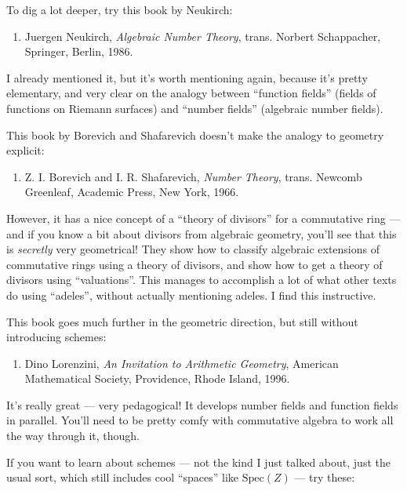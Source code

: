 \documentclass{article}
\def\tightlist{}
\begin{document}
To dig a lot deeper, try this book by Neukirch:

\begin{enumerate}
\def\labelenumi{\arabic{enumi})}
\setcounter{enumi}{2}
\tightlist
\item
  Juergen Neukirch, \emph{Algebraic Number Theory}, trans. Norbert
  Schappacher, Springer, Berlin, 1986.
\end{enumerate}

I already mentioned it, but it's worth mentioning again, because it's
pretty elementary, and very clear on the analogy between ``function
fields'' (fields of functions on Riemann surfaces) and ``number fields''
(algebraic number fields).

This book by Borevich and Shafarevich doesn't make the analogy to
geometry explicit:

\begin{enumerate}
\def\labelenumi{\arabic{enumi})}
\setcounter{enumi}{3}
\tightlist
\item
  Z. I. Borevich and I. R. Shafarevich, \emph{Number Theory}, trans.
  Newcomb Greenleaf, Academic Press, New York, 1966.
\end{enumerate}

However, it has a nice concept of a ``theory of divisors'' for a
commutative ring --- and if you know a bit about divisors from algebraic
geometry, you'll see that this is \emph{secretly} very geometrical! They
show how to classify algebraic extensions of commutative rings using a
theory of divisors, and show how to get a theory of divisors using
``valuations''. This manages to accomplish a lot of what other texts do
using ``adeles'', without actually mentioning adeles. I find this
instructive.

This book goes much further in the geometric direction, but still
without introducing schemes:

\begin{enumerate}
\def\labelenumi{\arabic{enumi})}
\setcounter{enumi}{4}
\tightlist
\item
  Dino Lorenzini, \emph{An Invitation to Arithmetic Geometry}, American
  Mathematical Society, Providence, Rhode Island, 1996.
\end{enumerate}

It's really great --- very pedagogical! It develops number fields and
function fields in parallel. You'll need to be pretty comfy with
commutative algebra to work all the way through it, though.

If you want to learn about schemes --- not the kind I just talked about,
just the usual sort, which still includes cool ``spaces'' like
\(\mathrm{Spec}(Z)\) --- try these:
\end{document}
